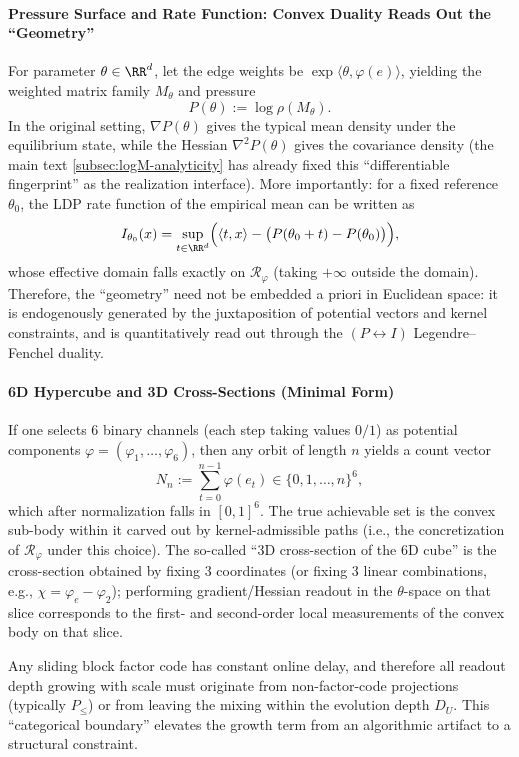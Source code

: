 \paragraph{Pressure Surface and Rate Function: Convex Duality Reads Out the ``Geometry''}
For parameter \(\theta\in\RR^d\), let the edge weights be \(\exp\langle\theta,\varphi(e)\rangle\), yielding the weighted matrix family \(M_\theta\) and pressure
$$
P(\theta):=\log\rho(M_\theta).
$$
In the original setting, \(\nabla P(\theta)\) gives the typical mean density under the equilibrium state, while the Hessian \(\nabla^2P(\theta)\) gives the covariance density (the main text \ref{subsec:logM-analyticity} has already fixed this ``differentiable fingerprint'' as the realization interface).
More importantly: for a fixed reference \(\theta_0\), the LDP rate function of the empirical mean can be written as
$$
I_{\theta_0}(x)=\sup_{t\in\RR^d}\Bigl(\langle t,x\rangle-\bigl(P(\theta_0+t)-P(\theta_0)\bigr)\Bigr),
$$
whose effective domain falls exactly on \(\mathcal{R}_\varphi\) (taking \(+\infty\) outside the domain).
Therefore, the ``geometry'' need not be embedded a priori in Euclidean space: it is endogenously generated by the juxtaposition of potential vectors and kernel constraints, and is quantitatively read out through the \((P\leftrightarrow I)\) Legendre--Fenchel duality.

\paragraph{6D Hypercube and 3D Cross-Sections (Minimal Form)}
If one selects \(6\) binary channels (each step taking values \(0/1\)) as potential components \(\varphi=(\varphi_1,\dots,\varphi_6)\), then any orbit of length \(n\) yields a count vector
$$
N_n:=\sum_{t=0}^{n-1}\varphi(e_t)\in\{0,1,\dots,n\}^6,
$$
which after normalization falls in \([0,1]^6\). The true achievable set is the convex sub-body within it carved out by kernel-admissible paths (i.e., the concretization of \(\mathcal{R}_\varphi\) under this choice).
The so-called ``3D cross-section of the 6D cube'' is the cross-section obtained by fixing \(3\) coordinates (or fixing \(3\) linear combinations, e.g., \(\chi=\varphi_e-\varphi_2\)); performing gradient/Hessian readout in the \(\theta\)-space on that slice corresponds to the first- and second-order local measurements of the convex body on that slice.

\begin{remark}\label{rem:pom-factor-boundary}
Any sliding block factor code has constant online delay, and therefore all readout depth growing with scale must originate from non-factor-code projections (typically $P_{\le}$) or from leaving the mixing within the evolution depth $D_U$. This ``categorical boundary'' elevates the growth term from an algorithmic artifact to a structural constraint.
\end{remark}

